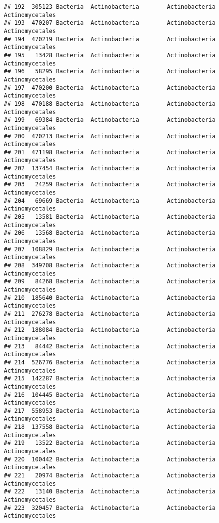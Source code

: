 \documentclass[
]{article}
\begin{document}
\begin{verbatim}
## 192  305123 Bacteria  Actinobacteria        Actinobacteria     Actinomycetales
## 193  470207 Bacteria  Actinobacteria        Actinobacteria     Actinomycetales
## 194  470219 Bacteria  Actinobacteria        Actinobacteria     Actinomycetales
## 195   13428 Bacteria  Actinobacteria        Actinobacteria     Actinomycetales
## 196   58295 Bacteria  Actinobacteria        Actinobacteria     Actinomycetales
## 197  470200 Bacteria  Actinobacteria        Actinobacteria     Actinomycetales
## 198  470188 Bacteria  Actinobacteria        Actinobacteria     Actinomycetales
## 199   69384 Bacteria  Actinobacteria        Actinobacteria     Actinomycetales
## 200  470213 Bacteria  Actinobacteria        Actinobacteria     Actinomycetales
## 201  471198 Bacteria  Actinobacteria        Actinobacteria     Actinomycetales
## 202  137454 Bacteria  Actinobacteria        Actinobacteria     Actinomycetales
## 203   24259 Bacteria  Actinobacteria        Actinobacteria     Actinomycetales
## 204   69669 Bacteria  Actinobacteria        Actinobacteria     Actinomycetales
## 205   13581 Bacteria  Actinobacteria        Actinobacteria     Actinomycetales
## 206   13568 Bacteria  Actinobacteria        Actinobacteria     Actinomycetales
## 207  108829 Bacteria  Actinobacteria        Actinobacteria     Actinomycetales
## 208  349708 Bacteria  Actinobacteria        Actinobacteria     Actinomycetales
## 209   84268 Bacteria  Actinobacteria        Actinobacteria     Actinomycetales
## 210  185640 Bacteria  Actinobacteria        Actinobacteria     Actinomycetales
## 211  276278 Bacteria  Actinobacteria        Actinobacteria     Actinomycetales
## 212  188084 Bacteria  Actinobacteria        Actinobacteria     Actinomycetales
## 213   84442 Bacteria  Actinobacteria        Actinobacteria     Actinomycetales
## 214  526776 Bacteria  Actinobacteria        Actinobacteria     Actinomycetales
## 215  142287 Bacteria  Actinobacteria        Actinobacteria     Actinomycetales
## 216  104445 Bacteria  Actinobacteria        Actinobacteria     Actinomycetales
## 217  558953 Bacteria  Actinobacteria        Actinobacteria     Actinomycetales
## 218  137558 Bacteria  Actinobacteria        Actinobacteria     Actinomycetales
## 219   13522 Bacteria  Actinobacteria        Actinobacteria     Actinomycetales
## 220  100442 Bacteria  Actinobacteria        Actinobacteria     Actinomycetales
## 221   20974 Bacteria  Actinobacteria        Actinobacteria     Actinomycetales
## 222   13140 Bacteria  Actinobacteria        Actinobacteria     Actinomycetales
## 223  320457 Bacteria  Actinobacteria        Actinobacteria     Actinomycetales

\end{verbatim}
\end{document}
